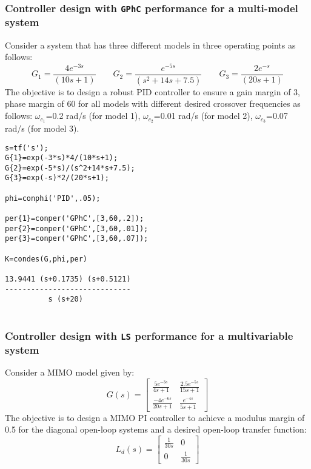 \documentclass [12pt , a4paper] {report}
\begin{document}
\subsubsection{Controller design with {\tt GPhC} performance for a multi-model system}
Consider a system that has three different models in three operating points as follows:
$$G_1=\frac{4e^{-3s}}{(10s+1)} \qquad G_2=\frac{e^{-5s}}{(s^2+14s+7.5)}  \qquad G_3=\frac{2e^{-s}}{(20s+1)}$$
The objective is to design a robust PID controller to ensure a gain margin of 3, phase margin of 60 for all models with different desired crossover frequencies as follows: $\omega_{c_1}$=0.2 rad/s (for model 1), $\omega_{c_2}$=0.01 rad/s (for model 2), $\omega_{c_3}$=0.07 rad/s (for model 3).

\begin{lstlisting}
s=tf('s');
G{1}=exp(-3*s)*4/(10*s+1);
G{2}=exp(-5*s)/(s^2+14*s+7.5);
G{3}=exp(-s)*2/(20*s+1);

phi=conphi('PID',.05);

per{1}=conper('GPhC',[3,60,.2]);
per{2}=conper('GPhC',[3,60,.01]);
per{3}=conper('GPhC',[3,60,.07]);

K=condes(G,phi,per)

13.9441 (s+0.1735) (s+0.5121)
-----------------------------
          s (s+20)
          
\end{lstlisting}

\subsubsection{Controller design with {\tt LS} performance for a multivariable system}
Consider a MIMO model given by:
$$ G(s)=\left[ \begin{array}{cc}
\frac{5e^{-3s}}{4s+1}  &  \frac{2.5e^{-5s}}{15s+1} \\[.25 cm]
\frac{-4e^{-6s}}{20s+1}  &  \frac{e^{-4s}}{5s+1} 
\end{array} \right] $$
The objective is to design a MIMO PI controller to achieve a modulus margin of 0.5 for the diagonal open-loop systems and a desired open-loop transfer function:
$$L_d(s)=\left[ \begin{array}{cc}
\frac{1}{30 s}  &  0 \\[.25 cm]
0  &  \frac{1}{30 s} 
\end{array} \right] $$
\end{document}

